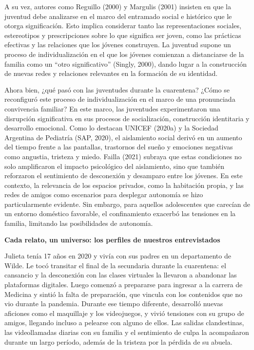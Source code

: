 A su vez, autores como Reguillo (2000) y Margulis (2001) insisten en que la juventud debe analizarse en el marco del entramado social e histórico que le otorga significación. Esto implica considerar tanto las representaciones sociales, estereotipos y prescripciones sobre lo que significa ser joven, como las prácticas efectivas y las relaciones que los jóvenes construyen. La juventud supone un proceso de individualización en el que los jóvenes comienzan a distanciarse de la familia como un ``otro significativo'' (Singly, 2000), dando lugar a la construcción de nuevas redes y relaciones relevantes en la formación de su identidad.

Ahora bien, ¿qué pasó con las juventudes durante la cuarentena? ¿Cómo se reconfiguró este proceso de individualización en el marco de una pronunciada convivencia familiar? En este marco, las juventudes experimentaron una disrupción significativa en sus procesos de socialización, construcción identitaria y desarrollo emocional. Como lo destacan UNICEF (2020a) y la Sociedad Argentina de Pediatría (SAP, 2020), el aislamiento social derivó en un aumento del tiempo frente a las pantallas, trastornos del sueño y emociones negativas como angustia, tristeza y miedo. Failla (2021) subraya que estas condiciones no solo amplificaron el impacto psicológico del aislamiento, sino que también reforzaron el sentimiento de desconexión y desamparo entre los jóvenes. En este contexto, la relevancia de los espacios privados, como la habitación propia, y las redes de amigos como escenarios para desplegar autonomía se hizo particularmente evidente. Sin embargo, para aquellos adolescentes que carecían de un entorno doméstico favorable, el confinamiento exacerbó las tensiones en la familia, limitando las posibilidades de autonomía.

\textbf{Cada relato, un universo: los perfiles de nuestros entrevistados}

Julieta tenía 17 años en 2020 y vivía con sus padres en un departamento de Wilde. Le tocó transitar el final de la secundaria durante la cuarentena: el cansancio y la desconexión con las clases virtuales la llevaron a abandonar las plataformas digitales. Luego comenzó a prepararse para ingresar a la carrera de Medicina y sintió la falta de preparación, que vincula con los contenidos que no vio durante la pandemia. Durante ese tiempo diferente, desarrolló nuevas aficiones como el maquillaje y los videojuegos, y vivió tensiones con su grupo de amigos, llegando incluso a pelearse con alguno de ellos. Las salidas clandestinas, las videollamadas diarias con su familia y el sentimiento de culpa la acompañaron durante un largo período, además de la tristeza por la pérdida de su abuela.

